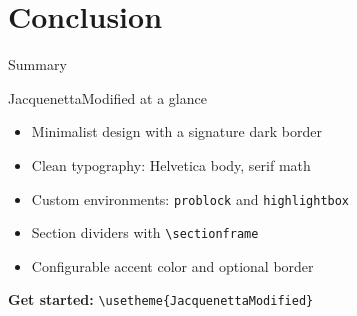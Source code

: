 \documentclass[aspectratio=169]{beamer}
\begin{document}
\section{Conclusion}


\begin{frame}{Summary}
    \begin{problock}{JacquenettaModified at a glance}
        \begin{itemize}
            \item Minimalist design with a signature dark border
            \item Clean typography: Helvetica body, serif math
            \item Custom environments: \texttt{problock} and
                  \texttt{highlightbox}
            \item Section dividers with \texttt{\textbackslash sectionframe}
            \item Configurable accent color and optional border
        \end{itemize}
    \end{problock}

    \vspace{0.3cm}
    \begin{highlightbox}
        \centering
        \textbf{Get started:}\quad
        \texttt{\textbackslash usetheme\{JacquenettaModified\}}
    \end{highlightbox}
\end{frame}

\thanksframe
\end{document}
